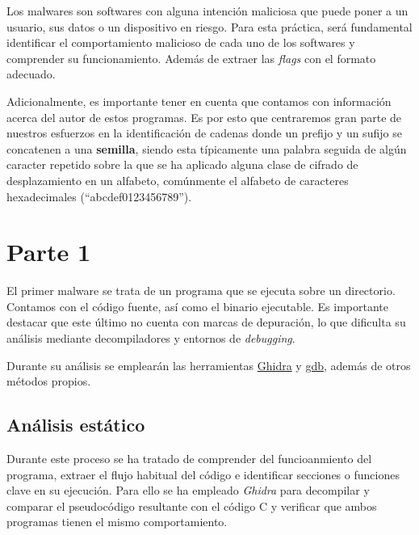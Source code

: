 \documentclass[]{article}
\begin{document}
Los malwares son softwares con alguna intención maliciosa que puede poner a un
usuario, sus datos o un dispositivo en riesgo. Para esta práctica, será
fundamental identificar el comportamiento malicioso de cada uno de los
softwares y comprender su funcionamiento. Además de extraer las \textit{flags}
con el formato adecuado.

Adicionalmente, es importante tener en cuenta que contamos con información
acerca del autor de estos programas. Es por esto que centraremos gran parte de
nuestros esfuerzos en la identificación de cadenas donde un prefijo y un sufijo
se concatenen a una \textbf{semilla}, siendo esta típicamente una palabra
seguida de algún caracter repetido sobre la que se ha aplicado alguna clase de
cifrado de desplazamiento en un alfabeto, comúnmente el alfabeto de caracteres
hexadecimales (``abcdef0123456789'').

\section{Parte 1}
\label{sec:type1}
El primer malware se trata de un programa que se ejecuta sobre un directorio.
Contamos con el código fuente, así como el binario ejecutable. Es importante
destacar que este último no cuenta con marcas de depuración, lo que dificulta
su análisis mediante decompiladores y entornos de \textit{debugging}.

Durante su análisis se emplearán las herramientas
\href{https://ghidra-sre.org/}{Ghidra} y
\href{https://man7.org/linux/man-pages/man1/gdb.1.html}{gdb}, además de otros
métodos propios.

\subsection{Análisis estático}
\label{subsec:analisis-estatico-1}

Durante este proceso se ha tratado de comprender del funcioanmiento del
programa, extraer el flujo habitual del código e identificar secciones o
funciones clave en su ejecución. Para ello se ha empleado \textit{Ghidra} 
para decompilar y comparar el pseudocódigo resultante con el código C y
verificar que ambos programas tienen el mismo comportamiento.
\end{document}
